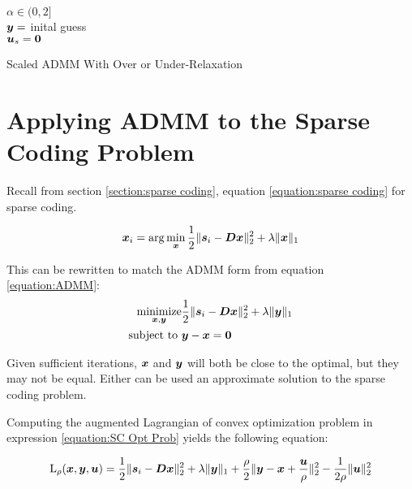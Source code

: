 \begin{algorithm}[H]
\SetAlgoLined
   $\alpha \in (0,2]$ \\
   $\bm{y} = $ inital guess \\
   $\bm{u}_s = \bm{0}$ \\
 \caption{Scaled ADMM With Over or Under-Relaxation}
\end{algorithm}


\section{Applying ADMM to the Sparse Coding Problem}
\label{section:Applying ADMM}
Recall from section \ref{section:sparse coding}, equation \ref{equation:sparse coding} for sparse coding.

\begin{equation}
\bm{x}_i = \arg\min_{\bm{x}} \frac{1}{2}\|\bm{s}_i - \bm{D}\bm{x}\|_2^2 + \lambda \|\bm{x}\|_1
\end{equation}

This can be rewritten to match the ADMM form from equation \ref{equation:ADMM}:
\begin{equation} \label{equation:SC Opt Prob}
\begin{aligned}
\operatorname*{\text{minimize}}_{\bm{x},\bm{y}} & \frac{1}{2} \|\bm{s}_i - \bm{D}\bm{x}\|_2^2 + \lambda\|\bm{y}\|_1 \\
         \text{subject to } & \bm{y} - \bm{x} = \bm{0}
\end{aligned}
\end{equation}

Given sufficient iterations, $\bm{x}$ and $\bm{y}$ will both be close to the optimal, but they may not be equal. Either can be used an approximate solution to the sparse coding problem.

Computing the augmented Lagrangian of convex optimization problem in expression \ref{equation:SC Opt Prob} yields the following equation:

\begin{equation}
\operatorname{L}_{\rho}(\bm{x},\bm{y},\bm{u}) = \frac{1}{2} \|\bm{s}_i - \bm{D}\bm{x}\|_2^2 + \lambda\|\bm{y}\|_1 + \frac{\rho}{2}\|\bm{y} - \bm{x} + \frac{\bm{u}}{\rho}\|_2^2 - \frac{1}{2\rho}\|\bm{u}\|_2^2
\end{equation}

